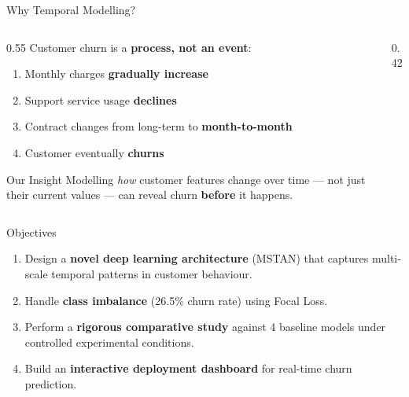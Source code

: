 \documentclass[aspectratio=169,11pt]{beamer}
\begin{document}
\begin{frame}{Why Temporal Modelling?}
\begin{columns}[T]
\begin{column}{0.55\textwidth}
Customer churn is a \textbf{process, not an event}:
\begin{enumerate}
    \item Monthly charges \textbf{gradually increase}
    \item Support service usage \textbf{declines}
    \item Contract changes from long-term to \textbf{month-to-month}
    \item Customer eventually \textbf{churns}
\end{enumerate}
\vspace{6pt}
\begin{exampleblock}{Our Insight}
Modelling \emph{how} customer features change over time — not just their current values — can reveal churn \textbf{before} it happens.
\end{exampleblock}
\end{column}
\begin{column}{0.42\textwidth}
\centering
{}
\end{column}
\end{columns}
\end{frame}

\begin{frame}{Objectives}
\begin{enumerate}
    \item Design a \textbf{novel deep learning architecture} (MSTAN) that captures multi-scale temporal patterns in customer behaviour.
    \item Handle \textbf{class imbalance} (26.5\% churn rate) using Focal Loss.
    \item Perform a \textbf{rigorous comparative study} against 4 baseline models under controlled experimental conditions.
    \item Build an \textbf{interactive deployment dashboard} for real-time churn prediction.
\end{enumerate}
\end{frame}
\end{document}
